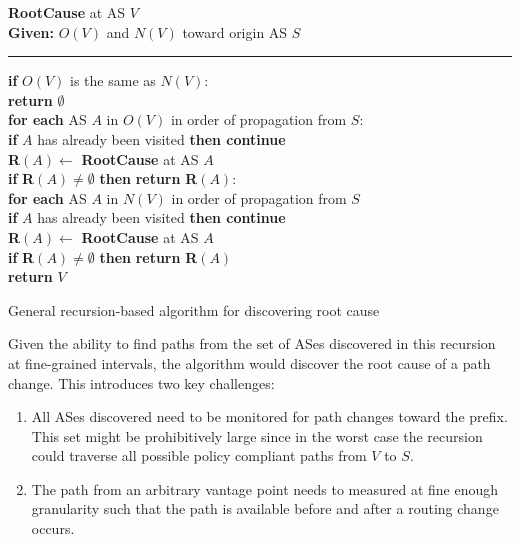 \begin{pseudocode}
\textbf{RootCause} at AS $V$ \\
\textbf{Given:} $O(V)$ and $N(V)$ toward origin AS $S$ \\
\hrule
\textbf{if} $O(V)$ is the same as $N(V)$: \\ %
\hspace*{0.2in} \textbf{return} $\boldsymbol{\emptyset}$ \\
\textbf{for each} AS $A$ in $O(V)$ in order of propagation from $S$: \\
   \hspace*{0.2in} \textbf{if} $A$ has already been visited \textbf{then continue} \\
   \hspace*{0.2in} \textbf{R}$(A) \leftarrow$ \textbf{RootCause} at AS $A$ \\
   \hspace*{0.2in} \textbf{if} \textbf{R}$(A) \ne
\boldsymbol{\emptyset}$ \textbf{then} \textbf{return} \textbf{R}$(A)$:  \\
\textbf{for each} AS $A$ in $N(V)$ in order of propagation from $S$ \\
   \hspace*{0.2in} \textbf{if} $A$ has already been visited \textbf{then continue} \\
   \hspace*{0.2in} \textbf{R}$(A) \leftarrow$ \textbf{RootCause} at AS $A$ \\
   \hspace*{0.2in} \textbf{if} \textbf{R}$(A) \ne
\boldsymbol{\emptyset}$ \textbf{then} \textbf{return} \textbf{R}$(A)$  \\
\textbf{return} $V$

\caption{General recursion-based algorithm for discovering root cause}
\label{fig:gen-algo}
\end{pseudocode}

Given the ability to find paths from the set of ASes discovered in this recursion
at fine-grained intervals, the algorithm
would discover the root cause of a path change. This introduces two key challenges: 

\begin{enumerate} 
\item All ASes discovered need to be monitored
for path changes toward the prefix. This set might be prohibitively large since 
in the worst case the recursion could traverse all  possible policy compliant 
paths from $V$ to $S$. 
\item The path from an arbitrary vantage point needs to measured at fine enough
granularity such that the path is available before and 
after a routing change occurs. 
\end{enumerate}

